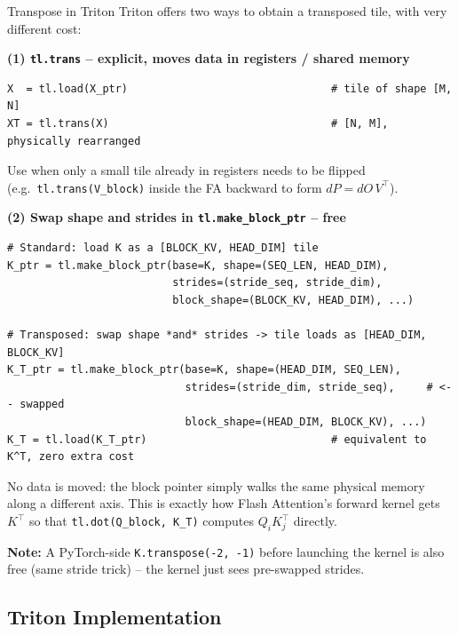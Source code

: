 \begin{frame}[fragile]{Transpose in Triton}
  Triton offers two ways to obtain a transposed tile, with very different cost:

  \textbf{(1) \texttt{tl.trans} -- explicit, moves data in registers / shared memory}
\begin{lstlisting}
X  = tl.load(X_ptr)                                # tile of shape [M, N]
XT = tl.trans(X)                                   # [N, M], physically rearranged
\end{lstlisting}
  Use when only a small tile already in registers needs to be flipped (e.g.\ \texttt{tl.trans(V\_block)} inside the FA backward to form $dP = dO\,V^\top$).

  \textbf{(2) Swap shape and strides in \texttt{tl.make\_block\_ptr} -- free}
\begin{lstlisting}
# Standard: load K as a [BLOCK_KV, HEAD_DIM] tile
K_ptr = tl.make_block_ptr(base=K, shape=(SEQ_LEN, HEAD_DIM),
                          strides=(stride_seq, stride_dim),
                          block_shape=(BLOCK_KV, HEAD_DIM), ...)

# Transposed: swap shape *and* strides -> tile loads as [HEAD_DIM, BLOCK_KV]
K_T_ptr = tl.make_block_ptr(base=K, shape=(HEAD_DIM, SEQ_LEN),
                            strides=(stride_dim, stride_seq),     # <-- swapped
                            block_shape=(HEAD_DIM, BLOCK_KV), ...)
K_T = tl.load(K_T_ptr)                             # equivalent to K^T, zero extra cost
\end{lstlisting}
  No data is moved: the block pointer simply walks the same physical memory along a different axis. This is exactly how Flash Attention's forward kernel gets $K^\top$ so that \texttt{tl.dot(Q\_block, K\_T)} computes $Q_i K_j^\top$ directly.

  \vspace{0.2em}
  {\footnotesize \textbf{Note:} A PyTorch-side \texttt{K.transpose(-2, -1)} before launching the kernel is also free (same stride trick) -- the kernel just sees pre-swapped strides.}
\end{frame}

\subsection{Triton Implementation}


